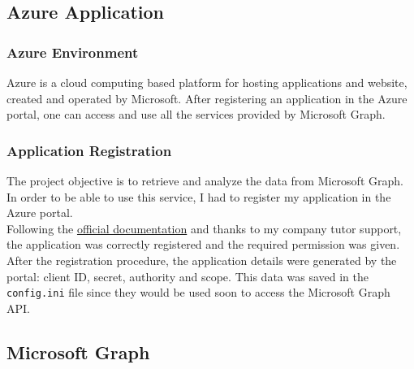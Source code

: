\documentclass[12pt, a4paper, oneside]{article}
\begin{document}
\subsection{Azure Application}
\subsubsection{Azure Environment}
Azure is a cloud computing based platform for hosting applications and website, created and operated by Microsoft. After registering an application in the Azure portal, one can access and use all the services
provided by Microsoft Graph.
\subsubsection{Application Registration}
The project objective is to retrieve and analyze the data from Microsoft Graph. In order to be able to use this service, I had to register my application in the Azure portal.\\
Following the \href{https://docs.microsoft.com/en-us/graph/auth-v2-service#authentication-and-authorization-steps}{official documentation} and thanks to my company tutor support, the application was correctly
registered and the required permission was given. After the registration procedure, the application details were generated by the portal: client ID, secret, authority and scope. This data was saved in the 
\texttt{config.ini} file since they would be used soon to access the Microsoft Graph API.

\subsection{Microsoft Graph}
\end{document}
